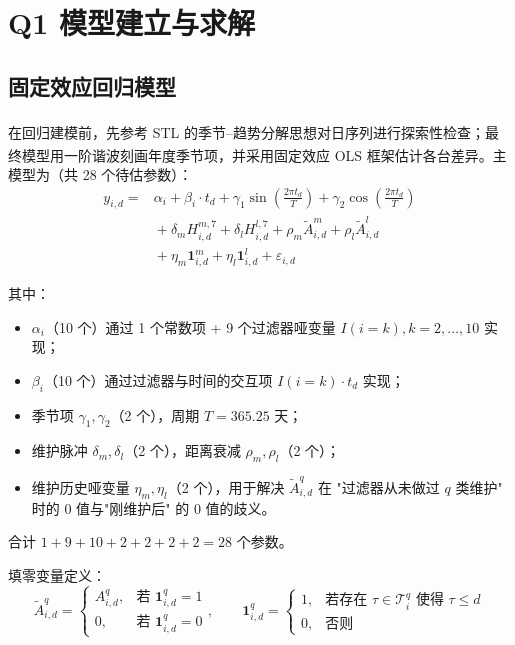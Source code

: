\documentclass[12pt, a4paper, fontset=fandol]{ctexart}
\let\oldcite\cite
\renewcommand{\cite}[1]{\textsuperscript{\oldcite{#1}}}
\theoremstyle{definition}
\begin{document}
\section{Q1 模型建立与求解}

\subsection{固定效应回归模型}

在回归建模前，先参考 STL 的季节--趋势分解思想对日序列进行探索性检查\cite{stl}；最终模型用一阶谐波刻画年度季节项，并采用固定效应 OLS 框架估计各台差异\cite{ols,econometrics_cn}。主模型为（共 28 个待估参数）：
\begin{equation}
\begin{aligned}
y_{i,d} ={} & \alpha_i + \beta_i \cdot t_d + \gamma_1 \sin\!\left(\tfrac{2\pi t_d}{T}\right) + \gamma_2 \cos\!\left(\tfrac{2\pi t_d}{T}\right) \\
& {} + \delta_m H_{i,d}^{m,7} + \delta_l H_{i,d}^{l,7}
       + \rho_m \tilde{A}_{i,d}^m + \rho_l \tilde{A}_{i,d}^l \\
& {} + \eta_m \mathbf{1}_{i,d}^m + \eta_l \mathbf{1}_{i,d}^l
       + \varepsilon_{i,d}
\end{aligned}
\label{eq:Q1_main}
\end{equation}

其中：
\begin{itemize}[leftmargin=2em]
  \item $\alpha_i$（10 个）通过 1 个常数项 + 9 个过滤器哑变量 $I(i=k), k=2,\dots,10$ 实现；
  \item $\beta_i$（10 个）通过过滤器与时间的交互项 $I(i=k) \cdot t_d$ 实现；
  \item 季节项 $\gamma_1, \gamma_2$（2 个），周期 $T = 365.25$ 天；
  \item 维护脉冲 $\delta_m, \delta_l$（2 个），距离衰减 $\rho_m, \rho_l$（2 个）；
  \item 维护历史哑变量 $\eta_m, \eta_l$（2 个），用于解决 $\tilde{A}_{i,d}^q$ 在 "过滤器从未做过 $q$ 类维护" 时的 0 值与"刚维护后" 的 0 值的歧义。
\end{itemize}

合计 $1 + 9 + 10 + 2 + 2 + 2 + 2 = 28$ 个参数。

填零变量定义：
\[
\tilde{A}_{i,d}^q = \begin{cases} A_{i,d}^q, & \text{若 } \mathbf{1}_{i,d}^q = 1 \\ 0, & \text{若 } \mathbf{1}_{i,d}^q = 0 \end{cases}, \qquad
\mathbf{1}_{i,d}^q = \begin{cases} 1, & \text{若存在 } \tau \in \mathcal{T}_i^q \text{ 使得 } \tau \le d \\ 0, & \text{否则} \end{cases}
\]
\end{document}
